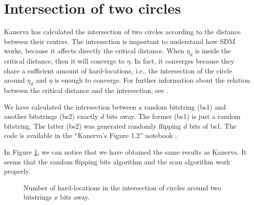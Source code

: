 \section{Intersection of two circles}

Kanerva has calculated the intersection of two circles according to the distance between their centers. The intersection is important to understand how SDM works, because it affects directly the critical distance. When $\eta_d$ is inside the critical distance, then it will converge to $\eta$. In fact, it converges because they share a sufficient amount of hard-locations, i.e., the intersection of the circle around $\eta_d$ and $\eta$ is enough to converge. For further information about the relation between the critical distance and the intersection, see \citet{brogliato2014sparse}.

We have calculated the intersection between a random bitstring (bs1) and another bitstrings (bs2) exactly $d$ bits away. The former (bs1) is just a random bitstring. The latter (bs2) was generated randomly flipping $d$ bits of bs1. The code is available in the ``Kanerva's Figure 1.2'' notebook \citep{sdmframework}.

In Figure \ref{fig:validation-intersection}, we can notice that we have obtained the same results as Kanerva. It seems that the random flipping bits algorithm and the scan algorithm work properly.

\begin{figure}[!htb]
  \centering

  \caption{Number of hard-locations in the intersection of circles around two bitstrings $x$ bits away.}
  \label{fig:validation-intersection}
\end{figure}

